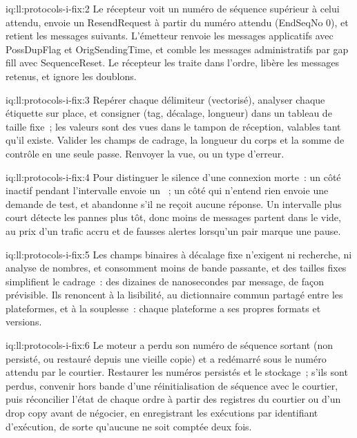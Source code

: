 \begin{solution}{iq:ll:protocols-i-fix:2}
Le récepteur voit un numéro de séquence supérieur à celui attendu, envoie un ResendRequest à partir du numéro attendu (EndSeqNo 0), et
retient les messages suivants. L'émetteur renvoie les messages applicatifs avec PossDupFlag et OrigSendingTime, et comble
les messages administratifs par gap fill avec SequenceReset. Le récepteur les traite dans l'ordre, libère les messages retenus, et ignore
les doublons.
\end{solution}

\begin{solution}{iq:ll:protocols-i-fix:3}
Repérer chaque délimiteur (vectorisé), analyser chaque étiquette sur place, et consigner (tag, décalage, longueur) dans un tableau de taille fixe~; les valeurs sont
des vues dans le tampon de réception, valables tant qu'il existe. Valider les champs de cadrage, la longueur du corps et la somme de contrôle en une seule passe.
Renvoyer la vue, ou un type d'erreur.
\end{solution}

\begin{solution}{iq:ll:protocols-i-fix:4}
Pour distinguer le silence d'une connexion morte~: un côté inactif pendant l'intervalle envoie un ~; un côté qui n'entend rien envoie une
demande de test, et abandonne s'il ne reçoit aucune réponse. Un intervalle plus court détecte les pannes plus tôt, donc moins de messages partent dans le vide, au
prix d'un trafic accru et de fausses alertes lorsqu'un pair marque une pause.
\end{solution}

\begin{solution}{iq:ll:protocols-i-fix:5}
Les champs binaires à décalage fixe n'exigent ni recherche, ni analyse de nombres, et consomment moins de bande passante, et des tailles fixes simplifient le cadrage~: des dizaines de
nanosecondes par message, de façon prévisible. Ils renoncent à la lisibilité, au dictionnaire commun partagé entre les plateformes, et à la souplesse~:
chaque plateforme a ses propres formats et versions.
\end{solution}

\begin{solution}{iq:ll:protocols-i-fix:6}
Le moteur a perdu son numéro de séquence sortant (non persisté, ou restauré depuis une vieille copie) et a redémarré sous le numéro
attendu par le courtier. Restaurer les numéros persistés et le stockage~; s'ils sont perdus, convenir hors bande d'une réinitialisation de séquence avec le courtier,
puis réconcilier l'état de chaque ordre à partir des registres du courtier ou d'un drop copy avant de négocier, en enregistrant les exécutions par
identifiant d'exécution, de sorte qu'aucune ne soit comptée deux fois.
\end{solution}
